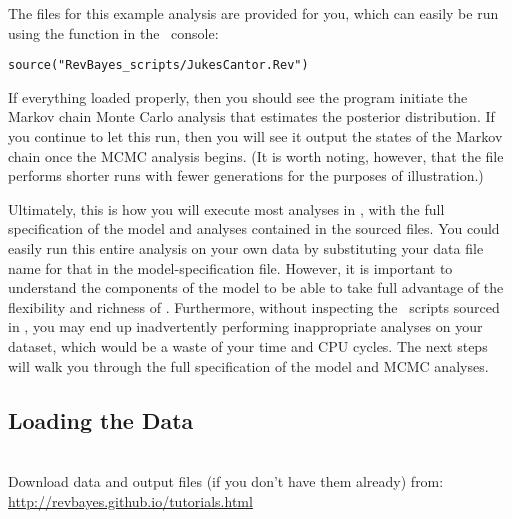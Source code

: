 The files for this example analysis are provided for you, which can easily be run using the  function in the \RevBayes~console:
{\tt \begin{snugshade*}
\begin{lstlisting}
source("RevBayes_scripts/JukesCantor.Rev")
\end{lstlisting}
\end{snugshade*}}

If everything loaded properly, then you should see the program initiate the Markov chain Monte Carlo analysis that estimates the posterior distribution. 
If you continue to let this run, then you will see it output the states of the Markov chain once the MCMC analysis begins. 
(It is worth noting, however, that the file  performs shorter runs with fewer generations for the purposes of illustration.)

Ultimately, this is how you will execute most analyses in \RevBayes, with the full specification of the model and analyses contained in the sourced files. 
You could easily run this entire analysis on your own data by substituting your data file name for that in the model-specification file. 
However, it is important to understand the components of the model to be able to take full advantage of the flexibility and richness of \RevBayes.
Furthermore, without inspecting the \Rev~scripts sourced in , you may end up inadvertently performing inappropriate analyses on your dataset, which would be a waste of your time and CPU cycles. 
The next steps will walk you through the full specification of the model and MCMC analyses. 

\bigskip

\subsection{Loading the Data}

\noindent \\ \impmark Download data and output files (if you don't have them already) from: \href{http://revbayes.github.io/tutorials.html}{http://revbayes.github.io/tutorials.html}


